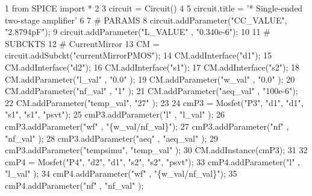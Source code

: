 \begin{DoxyCodeInclude}
1 \textcolor{keyword}{from} SPICE \textcolor{keyword}{import} *
2 
3 circuit = Circuit()
4 
5 circuit.title = \textcolor{stringliteral}{'* Single-ended two-stage amplifier'}
6 
7 \textcolor{comment}{# PARAMS}
8 circuit.addParameter(\textcolor{stringliteral}{"CC\_VALUE"}, \textcolor{stringliteral}{"2.8794pF"});
9 circuit.addParameter(\textcolor{stringliteral}{"L\_VALUE"} , \textcolor{stringliteral}{"0.340e-6"});
10 
11 \textcolor{comment}{# SUBCKTS}
12 \textcolor{comment}{# CurrentMirror}
13 CM = circuit.addSubckt(\textcolor{stringliteral}{"currentMirrorPMOS"});
14 CM.addInterface(\textcolor{stringliteral}{"d1"});
15 CM.addInterface(\textcolor{stringliteral}{"d2"});
16 CM.addInterface(\textcolor{stringliteral}{"s1"});
17 CM.addInterface(\textcolor{stringliteral}{"s2"});
18 CM.addParameter(\textcolor{stringliteral}{"l\_val"}   , \textcolor{stringliteral}{"0.0"}   );
19 CM.addParameter(\textcolor{stringliteral}{"w\_val"}   , \textcolor{stringliteral}{"0.0"}   );
20 CM.addParameter(\textcolor{stringliteral}{"nf\_val"}  , \textcolor{stringliteral}{"1"}     );
21 CM.addParameter(\textcolor{stringliteral}{"aeq\_val"} , \textcolor{stringliteral}{"100e-6"});
22 CM.addParameter(\textcolor{stringliteral}{"temp\_val"}, \textcolor{stringliteral}{"27"}    );
23 
24 cmP3 = Mosfet(\textcolor{stringliteral}{"P3"}, \textcolor{stringliteral}{"d1"}, \textcolor{stringliteral}{"d1"}, \textcolor{stringliteral}{"s1"}, \textcolor{stringliteral}{"s1"}, \textcolor{stringliteral}{"psvt"});
25 cmP3.addParameter(\textcolor{stringliteral}{"l"}       , \textcolor{stringliteral}{"l\_val"}         );
26 cmP3.addParameter(\textcolor{stringliteral}{"wf"}      , \textcolor{stringliteral}{"\{w\_val/nf\_val\}"});
27 cmP3.addParameter(\textcolor{stringliteral}{"nf"}      , \textcolor{stringliteral}{"nf\_val"}        );
28 cmP3.addParameter(\textcolor{stringliteral}{"aeq"}     , \textcolor{stringliteral}{"aeq\_val"}       );
29 cmP3.addParameter(\textcolor{stringliteral}{"tempsimu"}, \textcolor{stringliteral}{"temp\_val"}      );
30 CM.addInstance(cmP3);
31 
32 cmP4 = Mosfet(\textcolor{stringliteral}{"P4"}, \textcolor{stringliteral}{"d2"}, \textcolor{stringliteral}{"d1"}, \textcolor{stringliteral}{"s2"}, \textcolor{stringliteral}{"s2"}, \textcolor{stringliteral}{"psvt"});
33 cmP4.addParameter(\textcolor{stringliteral}{"l"}       , \textcolor{stringliteral}{"l\_val"}         );
34 cmP4.addParameter(\textcolor{stringliteral}{"wf"}      , \textcolor{stringliteral}{"\{w\_val/nf\_val\}"});
35 cmP4.addParameter(\textcolor{stringliteral}{"nf"}      , \textcolor{stringliteral}{"nf\_val"}        );

\end{DoxyCodeInclude}
